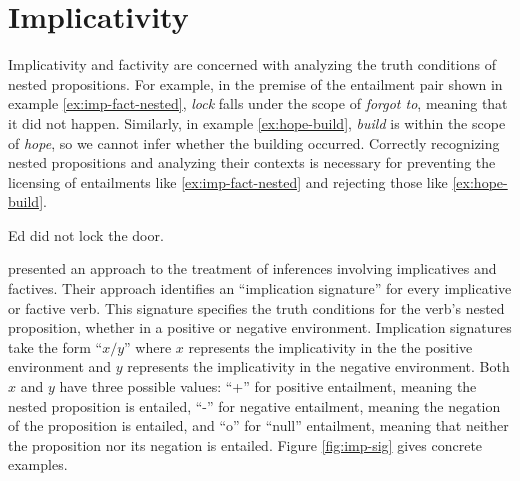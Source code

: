 \section{Implicativity}

Implicativity and factivity are concerned with analyzing the truth conditions of
nested propositions.  For example, in the premise of the entailment pair shown
in example \eqref{ex:imp-fact-nested}, {\it lock} falls under the scope of
{\it forgot to}, meaning that it did not happen.  Similarly, in example
\eqref{ex:hope-build}, {\it build} is within the scope of {\it hope}, so we
cannot infer whether the building occurred. Correctly recognizing nested
propositions and analyzing their contexts is necessary for preventing
the licensing of entailments like \eqref{ex:imp-fact-nested} and rejecting those
like \eqref{ex:hope-build}.

{Ed did not lock the door.}



\citet{nairn:icos2006} presented an approach to the treatment of inferences
involving implicatives and factives.  Their approach identifies an ``implication
signature'' for every implicative or factive verb.  This signature specifies the
truth conditions for the verb's nested proposition, whether in a positive or
negative environment.  Implication signatures take the form ``$x/y$'' where $x$
represents the implicativity in the the positive environment and $y$ represents
the implicativity in the negative environment.  Both $x$ and $y$ have three
possible values: ``+'' for positive entailment, meaning the nested proposition
is entailed, ``-'' for negative entailment, meaning the negation of the
proposition is entailed, and ``o'' for ``null'' entailment, meaning that neither
the proposition nor its negation is entailed. Figure \ref{fig:imp-sig} gives
concrete examples.


